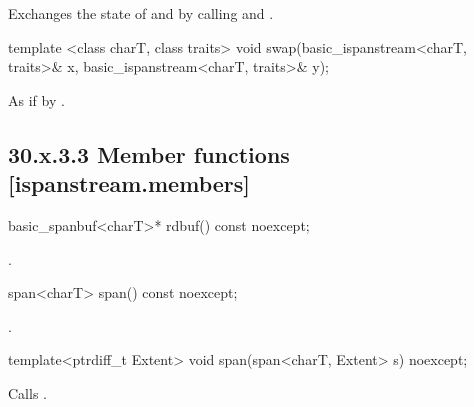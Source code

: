 \documentclass[ebook,11pt,article]{memoir}
\begin{document}
\begin{itemdescr}
\pnum
\effects Exchanges the state of  and
 by calling
 and
.
\end{itemdescr}


\begin{itemdecl}
template <class charT, class traits>
  void swap(basic_ispanstream<charT, traits>& x,
            basic_ispanstream<charT, traits>& y);
\end{itemdecl}

\begin{itemdescr}
\pnum
\effects As if by .
\end{itemdescr}

\subsection{30.x.3.3 Member functions [ispanstream.members]}
\label{ispanstream.members}

\begin{itemdecl}
basic_spanbuf<charT>* rdbuf() const noexcept;
\end{itemdecl}

\begin{itemdescr}
\pnum
\returns
{}.
\end{itemdescr}

\begin{itemdecl}
span<charT> span() const noexcept;
\end{itemdecl}

\begin{itemdescr}
\pnum
\returns
{}.
\end{itemdescr}

\begin{itemdecl}
template<ptrdiff_t Extent>
void span(span<charT, Extent> s) noexcept;
\end{itemdecl}

\begin{itemdescr}
\pnum
\effects
Calls
.
\end{itemdescr}

\end{document}

